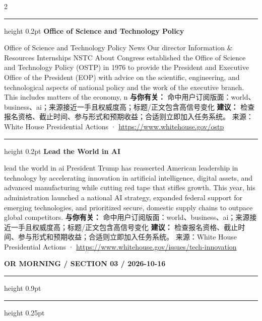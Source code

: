 \documentclass[10.5pt]{ctexart}
\begin{document}
\begin{multicols}{2}
\vspace{2mm}
\hrule height 0.2pt
\vspace{2mm}
{\large\bfseries Office of Science and Technology Policy}\par
Office of Science and Technology Policy News Our director Information \& Resources Internships NSTC About Congress established the Office of Science and Technology Policy (OSTP) in 1976 to provide the President and Executive Office of the President (EOP) with advice on the scientific, engineering, and technological aspects of national policy and the work of the executive branch. This includes matters of the economy, n
\textbf{与你有关：} 命中用户订阅版面：world、business、ai；来源接近一手且权威度高；标题/正文包含高信号变化
\textbf{建议：} 检查报名资格、截止时间、参与形式和预期收益；合适则立即加入任务系统。
{\footnotesize\color{ormuted} 来源：White House Presidential Actions · \url{https://www.whitehouse.gov/ostp}}
\vspace{2mm}
\hrule height 0.2pt
\vspace{2mm}
{\large\bfseries Lead the World in AI}\par
lead the world in ai President Trump has reasserted American leadership in technology by accelerating innovation in artificial intelligence, digital assets, and advanced manufacturing while cutting red tape that stifles growth. This year, his administration launched a national AI strategy, expanded federal support for emerging technologies, and prioritized secure, domestic supply chains to outpace global competitors.
\textbf{与你有关：} 命中用户订阅版面：world、business、ai；来源接近一手且权威度高；标题/正文包含高信号变化
\textbf{建议：} 检查报名资格、截止时间、参与形式和预期收益；合适则立即加入任务系统。
{\footnotesize\color{ormuted} 来源：White House Presidential Actions · \url{https://www.whitehouse.gov/issues/tech-innovation}}
\end{multicols}
\newpage
{\small\bfseries OR MORNING / SECTION 03 / 2026-10-16}
\vspace{2mm}
\hrule height 0.9pt
\vspace{1.5mm}
\hrule height 0.25pt
\vspace{4mm}
\end{document}
